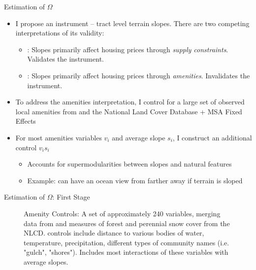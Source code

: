 \documentclass{beamer}
\theoremstyle{plain}
\begin{document}
\begin{frame}{Estimation of $\Omega$}
 \begin{itemize}
 	\color{black}
 	\itemsep1em
 	\item I propose an instrument -- tract level terrain slopes. There are two competing interpretations of its validity:
 	\begin{itemize}
 		\color{black}
 		\item \cite{saiz2010}: Slopes primarily affect housing prices through \textit{supply constraints}. \color{blue} Validates the instrument\color{black}.
 		\item \cite{LeeandLin}: Slopes primarily affect housing prices through \textit{amenities}. \color{red} Invalidates the instrument\color{black}.
 		
 	\end{itemize} \pause
 	\item To address the amenities interpretation, I control for a large set of observed local amenities from \cite{LeeandLin} and the National Land Cover Database + MSA Fixed Effects \pause
 	\item For most amenities variables $v_{i}$ and average slope $s_{i}$, I construct an additional control $v_{i}s_{i}$
 	\begin{itemize}
 		\item Accounts for supermodularities between slopes and natural features
 		\item Example: can have an ocean view from farther away if terrain is sloped
 	\end{itemize} 
 \end{itemize}
\end{frame}

\begin{frame}{Estimation of $\Omega$: First Stage}
	\color{black}
	\begin{figure}
		\centerline{\resizebox{12cm}{3cm}{}}	
	\caption{\scriptsize Amenity Controls: A set of approximately 240 variables, merging data from \cite{LeeandLin} and measures of forest and perennial snow cover from the NLCD. \cite{LeeandLin} controls include distance to various bodies of water, temperature, precipitation, different types of community names (i.e. "gulch", "shores"). Includes most interactions of these variables with average slopes.}
	\end{figure}	
\end{frame}
\end{document}
